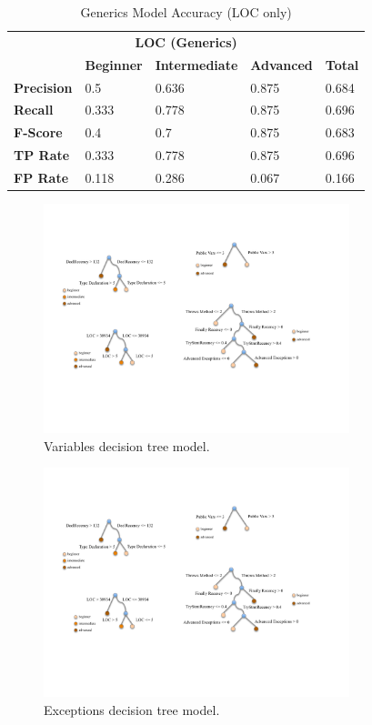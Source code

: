 \begin{table}
	\centering
	\caption{Generics Model Accuracy (LOC only)}
	\label{tab:loc}
	\begin{tabular}{lllll}
		\toprule
		\multicolumn{5}{c}{\textbf{LOC (Generics)}}                                                         \\
		\cmidrule(lr){1-5}
		& \textbf{Beginner} & \textbf{Intermediate} & \textbf{Advanced} & \textbf{Total} \\
		\midrule
		\textbf{Precision} & 0.5               & 0.636                 & 0.875             & 0.684          \\
		\textbf{Recall}    & 0.333             & 0.778                 & 0.875             & 0.696          \\
		\textbf{F-Score}   & 0.4               & 0.7                   & 0.875             & 0.683          \\
		\textbf{TP Rate}   & 0.333             & 0.778                 & 0.875             & 0.696          \\
		\textbf{FP Rate}   & 0.118             & 0.286                 & 0.067             & 0.166         \\
		\bottomrule
	\end{tabular}
\end{table}

\begin{figure} [h]
	\centering
	\includegraphics[width=3.5in]{Chapter-6/figs/variables.pdf}
	\caption{Variables decision tree model.}
	\label{fig:vars}
\end{figure}

\begin{figure} [h]
	\centering
	\includegraphics[width=3.5in]{Chapter-6/figs/exceptions.pdf}
	\caption{Exceptions decision tree model.}
	\label{fig:excep}
\end{figure}

